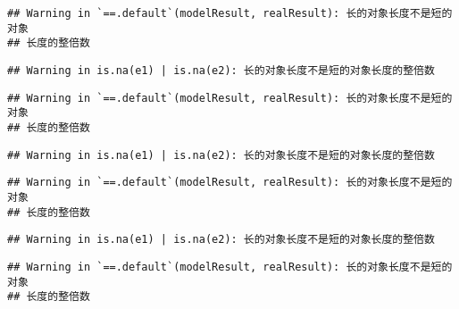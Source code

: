 \documentclass[]{article}
\newenvironment{Shaded}{\begin{snugshade}}{\end{snugshade}}
\newcommand{\CommentTok}[1]{\textcolor[rgb]{0.56,0.35,0.01}{\textit{#1}}}
\newcommand{\ControlFlowTok}[1]{\textcolor[rgb]{0.13,0.29,0.53}{\textbf{#1}}}
\newcommand{\DecValTok}[1]{\textcolor[rgb]{0.00,0.00,0.81}{#1}}
\newcommand{\KeywordTok}[1]{\textcolor[rgb]{0.13,0.29,0.53}{\textbf{#1}}}
\newcommand{\NormalTok}[1]{#1}
\newcommand{\OperatorTok}[1]{\textcolor[rgb]{0.81,0.36,0.00}{\textbf{#1}}}
\newcommand{\StringTok}[1]{\textcolor[rgb]{0.31,0.60,0.02}{#1}}
\begin{document}
\begin{Shaded}
\end{Shaded}

\begin{verbatim}
## Warning in `==.default`(modelResult, realResult): 长的对象长度不是短的对象
## 长度的整倍数
\end{verbatim}

\begin{verbatim}
## Warning in is.na(e1) | is.na(e2): 长的对象长度不是短的对象长度的整倍数
\end{verbatim}

\begin{verbatim}
## Warning in `==.default`(modelResult, realResult): 长的对象长度不是短的对象
## 长度的整倍数
\end{verbatim}

\begin{verbatim}
## Warning in is.na(e1) | is.na(e2): 长的对象长度不是短的对象长度的整倍数
\end{verbatim}

\begin{verbatim}
## Warning in `==.default`(modelResult, realResult): 长的对象长度不是短的对象
## 长度的整倍数
\end{verbatim}

\begin{verbatim}
## Warning in is.na(e1) | is.na(e2): 长的对象长度不是短的对象长度的整倍数
\end{verbatim}

\begin{verbatim}
## Warning in `==.default`(modelResult, realResult): 长的对象长度不是短的对象
## 长度的整倍数
\end{verbatim}
\end{document}
